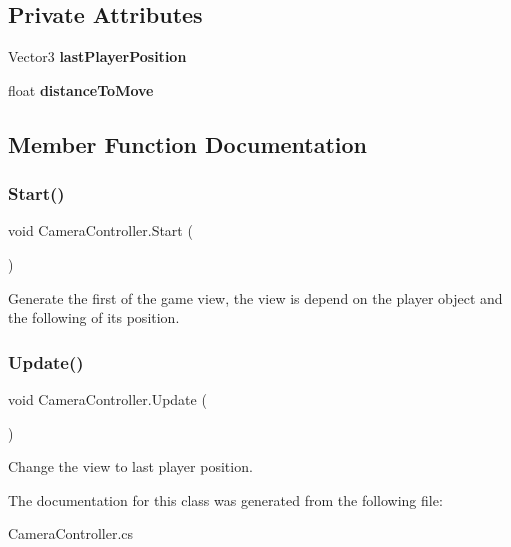 \subsection*{Private Attributes}
\begin{DoxyCompactItemize}
\item 
\hypertarget{class_camera_controller_ab95b809de6ec2de1d3d9e5fdccffc560}{}\label{class_camera_controller_ab95b809de6ec2de1d3d9e5fdccffc560} 
Vector3 {\bfseries last\+Player\+Position}
\item 
\hypertarget{class_camera_controller_a41879a0dd4ff4536658d3dd9245bb68c}{}\label{class_camera_controller_a41879a0dd4ff4536658d3dd9245bb68c} 
float {\bfseries distance\+To\+Move}
\end{DoxyCompactItemize}


\subsection{Member Function Documentation}
\hypertarget{class_camera_controller_ad4a238c6f7db3ee003302a245d860860}{}\label{class_camera_controller_ad4a238c6f7db3ee003302a245d860860} 
\subsubsection{\texorpdfstring{Start()}{Start()}}
{\footnotesize\ttfamily void Camera\+Controller.\+Start (\begin{DoxyParamCaption}{ }\end{DoxyParamCaption})\hspace{0.3cm}{\ttfamily [private]}}



Generate the first of the game view, the view is depend on the player object and the following of it\textquotesingle{}s position. 

\hypertarget{class_camera_controller_a7c4f486f4bcbd1d54a346fdce9707bd5}{}\label{class_camera_controller_a7c4f486f4bcbd1d54a346fdce9707bd5} 
\subsubsection{\texorpdfstring{Update()}{Update()}}
{\footnotesize\ttfamily void Camera\+Controller.\+Update (\begin{DoxyParamCaption}{ }\end{DoxyParamCaption})\hspace{0.3cm}{\ttfamily [private]}}



Change the view to last player position. 



The documentation for this class was generated from the following file\+:\begin{DoxyCompactItemize}
\item 
Camera\+Controller.\+cs\end{DoxyCompactItemize}
